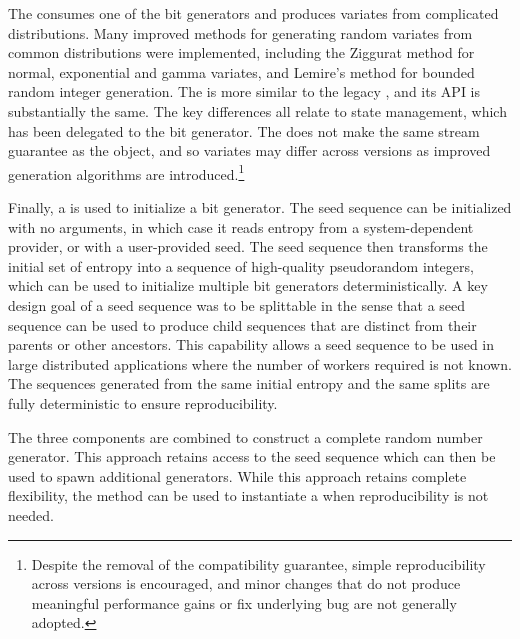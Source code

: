 The  consumes one of the bit generators and produces variates
from complicated distributions. Many improved methods for generating random
variates from common distributions were implemented, including the Ziggurat
method for normal, exponential and gamma variates\cite{ziggurat}, and Lemire's
method for bounded random integer generation\cite{lemire}. The 
is more similar to the legacy , and its API is substantially
the same. The key differences all relate to state management, which has been
delegated to the bit generator. The  does not make the same
stream guarantee as the  object, and so variates may differ
across versions as improved generation algorithms are
introduced.\footnote{Despite the removal of the compatibility guarantee, simple
reproducibility across versions is encouraged, and minor changes that do not
produce meaningful performance gains or fix underlying bug are not generally
adopted.}

Finally, a  is used to initialize a bit generator. The seed
sequence can be initialized with no arguments, in which case it reads entropy
from a system-dependent provider, or with a user-provided seed. The seed
sequence then transforms the initial set of entropy into a sequence of
high-quality pseudorandom integers, which can be used to initialize multiple bit
generators deterministically. A key design goal of a seed sequence was to be
splittable in the sense that a seed sequence can be used to produce child
sequences that are distinct from their parents or other ancestors. This
capability allows a seed sequence to be used in large distributed applications
where the number of workers required is not known. The sequences generated from
the same initial entropy and the same splits are fully deterministic to ensure
reproducibility.

The three components are combined to construct a complete random number
generator.
%
%
%
This approach retains access to the seed sequence which can then be
used to spawn additional generators.
%
%
While this approach retains complete flexibility, the method
 can be used to instantiate a  when
reproducibility is not needed.

